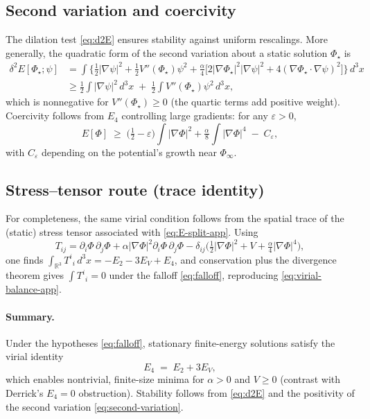 \documentclass{article}
\begin{document}
\subsection{Second variation and coercivity}
\label{app:coercivity}
The dilation test \eqref{eq:d2E} ensures stability against uniform rescalings. More generally, the quadratic form of the second variation about a static solution $\Phi_\star$ is
\begin{align}
\delta^2 E[\Phi_\star;\psi] &= \int \Big\{\tfrac12|\nabla\psi|^2 + \tfrac12 V''(\Phi_\star)\psi^2
+ \tfrac{\alpha}{4}\Big[ 2|\nabla\Phi_\star|^2|\nabla\psi|^2 + 4(\nabla\Phi_\star\!\cdot\!\nabla\psi)^2 \Big]\Big\}\,d^3x \nonumber\\
&\ge \frac12\!\int |\nabla\psi|^2\,d^3x \;+\; \frac12\!\int V''(\Phi_\star)\psi^2\,d^3x,
\label{eq:second-variation}
\end{align}
which is nonnegative for $V''(\Phi_\star)\!\ge\!0$ (the quartic terms add positive weight). Coercivity follows from $E_4$ controlling large gradients: for any $\varepsilon\!>\!0$,
\begin{equation}
E[\Phi]\;\ge\; \Big(\tfrac12-\varepsilon\Big)\!\int |\nabla\Phi|^2 + \tfrac{\alpha}{8}\!\int |\nabla\Phi|^4 \;-\; C_\varepsilon,
\label{eq:coercive}
\end{equation}
with $C_\varepsilon$ depending on the potential’s growth near $\Phi_\infty$.

\subsection{Stress--tensor route (trace identity)}
\label{app:stress-trace}
For completeness, the same virial condition follows from the spatial trace of the (static) stress tensor associated with \eqref{eq:E-split-app}. Using
\[
T_{ij} = \partial_i\Phi\,\partial_j\Phi + \alpha |\nabla\Phi|^2 \partial_i\Phi\,\partial_j\Phi
- \delta_{ij}\Big(\tfrac12|\nabla\Phi|^2 + V + \tfrac{\alpha}{4}|\nabla\Phi|^4\Big),
\]
one finds $\int_{\mathbb{R}^3} T^i{}_i\,d^3x = -E_2 - 3E_V + E_4$, and conservation plus the divergence theorem gives $\int T^i{}_i=0$ under the falloff \eqref{eq:falloff}, reproducing \eqref{eq:virial-balance-app}.

\paragraph{Summary.}
Under the hypotheses \eqref{eq:falloff}, stationary finite-energy solutions satisfy the virial identity
\[
E_4 \;=\; E_2 + 3E_V,
\]
which enables nontrivial, finite-size minima for $\alpha>0$ and $V\!\ge\!0$ (contrast with Derrick’s $E_4{=}0$ obstruction). Stability follows from \eqref{eq:d2E} and the positivity of the second variation \eqref{eq:second-variation}.
\end{document}
